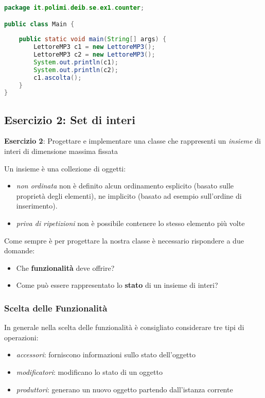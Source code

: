 \documentclass{article}
\begin{document}
\begin{lstlisting}[language=Java,escapechar=|]
package it.polimi.deib.se.ex1.counter;

public class Main {
	
	public static void main(String[] args) {
		LettoreMP3 c1 = new LettoreMP3();
		LettoreMP3 c2 = new LettoreMP3();
		System.out.println(c1);
		System.out.println(c2);
		c1.ascolta();
	}
}
\end{lstlisting}



\subsection{Esercizio 2: Set di interi}

\begin{framed}
\textbf{Esercizio 2}: Progettare e implementare una classe che rappresenti un \emph{insieme} di interi di dimensione massima fissata
\end{framed}
Un insieme \`e una collezione di oggetti:
\begin{itemize}
	\item \emph{non ordinata} non è definito alcun ordinamento esplicito (basato sulle proprietà degli elementi),
	ne implicito (basato ad esempio sull'ordine di inserimento).
	\item \emph{priva di ripetizioni} non è possibile contenere lo stesso elemento più volte
\end{itemize}

Come sempre \`e per progettare la nostra classe \`e necessario rispondere a due domande:
\begin{itemize}
		\item Che \textbf{funzionalità} deve offrire?
	\item Come può essere rappresentato lo \textbf{stato} di un insieme di interi?
\end{itemize}

\subsubsection{Scelta delle Funzionalit\`a}
In generale nella scelta delle funzionalit\`a \`e consigliato considerare tre tipi di operazioni:

\begin{itemize}
\item \emph{accessori}: forniscono informazioni sullo stato dell'oggetto
\item \emph{modificatori}: modificano lo stato di un oggetto
\item \emph{produttori}: generano un nuovo oggetto partendo dall'istanza corrente
\end{itemize}
\end{document}
